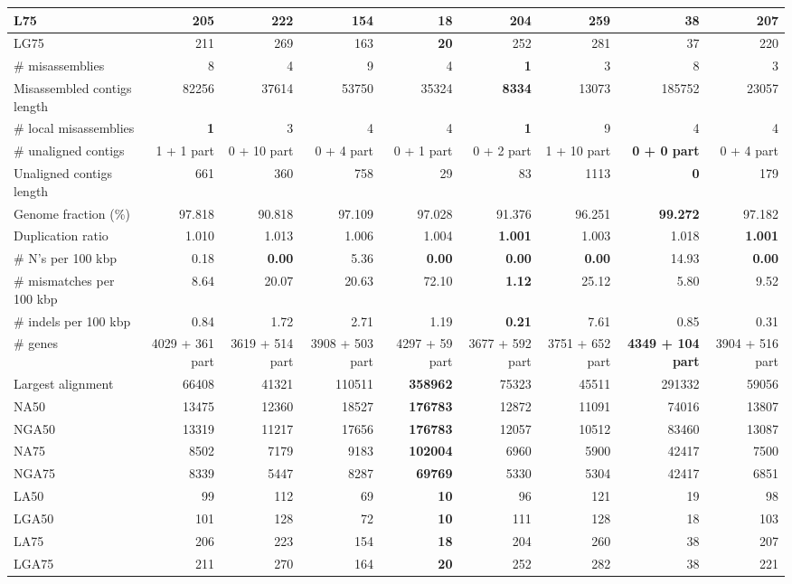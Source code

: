 \documentclass[12pt,a4paper]{article}
\begin{document}
\begin{table}[ht]
\begin{center}
\begin{tabular}{|l*{8}{|r}|}
L75 & 205 & 222 & 154 & {\bf 18} & 204 & 259 & 38 & 207 \\ \hline
LG75 & 211 & 269 & 163 & {\bf 20} & 252 & 281 & 37 & 220 \\ \hline
\# misassemblies & 8 & 4 & 9 & 4 & {\bf 1} & 3 & 8 & 3 \\ \hline
Misassembled contigs length & 82256 & 37614 & 53750 & 35324 & {\bf 8334} & 13073 & 185752 & 23057 \\ \hline
\# local misassemblies & {\bf 1} & 3 & 4 & 4 & {\bf 1} & 9 & 4 & 4 \\ \hline
\# unaligned contigs & 1 + 1 part & 0 + 10 part & 0 + 4 part & 0 + 1 part & 0 + 2 part & 1 + 10 part & {\bf 0 + 0 part} & 0 + 4 part \\ \hline
Unaligned contigs length & 661 & 360 & 758 & 29 & 83 & 1113 & {\bf 0} & 179 \\ \hline
Genome fraction (\%) & 97.818 & 90.818 & 97.109 & 97.028 & 91.376 & 96.251 & {\bf 99.272} & 97.182 \\ \hline
Duplication ratio & 1.010 & 1.013 & 1.006 & 1.004 & {\bf 1.001} & 1.003 & 1.018 & {\bf 1.001} \\ \hline
\# N's per 100 kbp & 0.18 & {\bf 0.00} & 5.36 & {\bf 0.00} & {\bf 0.00} & {\bf 0.00} & 14.93 & {\bf 0.00} \\ \hline
\# mismatches per 100 kbp & 8.64 & 20.07 & 20.63 & 72.10 & {\bf 1.12} & 25.12 & 5.80 & 9.52 \\ \hline
\# indels per 100 kbp & 0.84 & 1.72 & 2.71 & 1.19 & {\bf 0.21} & 7.61 & 0.85 & 0.31 \\ \hline
\# genes & 4029 + 361 part & 3619 + 514 part & 3908 + 503 part & 4297 + 59 part & 3677 + 592 part & 3751 + 652 part & {\bf 4349 + 104 part} & 3904 + 516 part \\ \hline
Largest alignment & 66408 & 41321 & 110511 & {\bf 358962} & 75323 & 45511 & 291332 & 59056 \\ \hline
NA50 & 13475 & 12360 & 18527 & {\bf 176783} & 12872 & 11091 & 74016 & 13807 \\ \hline
NGA50 & 13319 & 11217 & 17656 & {\bf 176783} & 12057 & 10512 & 83460 & 13087 \\ \hline
NA75 & 8502 & 7179 & 9183 & {\bf 102004} & 6960 & 5900 & 42417 & 7500 \\ \hline
NGA75 & 8339 & 5447 & 8287 & {\bf 69769} & 5330 & 5304 & 42417 & 6851 \\ \hline
LA50 & 99 & 112 & 69 & {\bf 10} & 96 & 121 & 19 & 98 \\ \hline
LGA50 & 101 & 128 & 72 & {\bf 10} & 111 & 128 & 18 & 103 \\ \hline
LA75 & 206 & 223 & 154 & {\bf 18} & 204 & 260 & 38 & 207 \\ \hline
LGA75 & 211 & 270 & 164 & {\bf 20} & 252 & 282 & 38 & 221 \\ \hline
\end{tabular}
\end{center}
\end{table}
\end{document}

